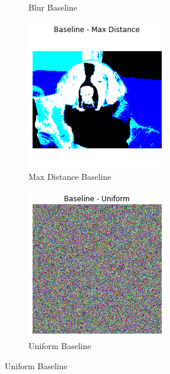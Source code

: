 \begin{figure}[h]
\begin{subfigure}{.23\textwidth}
    \caption{Blur Baseline}\label{fig:ig-baseline-blur}
\end{subfigure}
 \begin{subfigure}{.23\textwidth}
    \centering
    \includegraphics[width=\textwidth]{methods/images/ig-saint_bernard-max-dist.png}
    \caption{Max Distance Baseline}\label{fig:ig-baseline-max-dist}
\end{subfigure}
 \begin{subfigure}{.23\textwidth}
    \centering
    \includegraphics[width=\textwidth]{methods/images/ig-saint_bernard-uniform.png}
    \caption{Uniform Baseline}\label{fig:ig-baseline-uniform}
\end{subfigure}


\end{figure}
